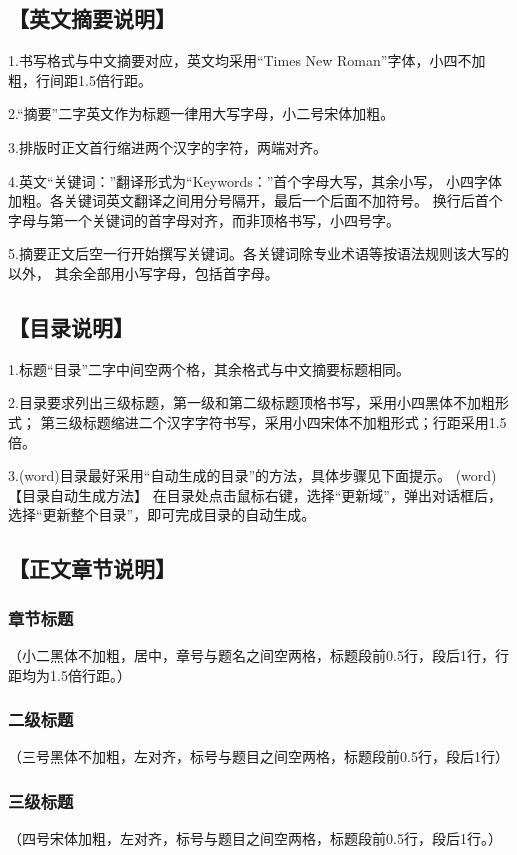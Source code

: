 \begin{appendices}
    \subsection*{【英文摘要说明】}
    1.书写格式与中文摘要对应，英文均采用“Times New Roman”字体，小四不加粗，行间距1.5倍行距。

    2.“摘要”二字英文作为标题一律用大写字母，小二号宋体加粗。

    3.排版时正文首行缩进两个汉字的字符，两端对齐。

    4.英文“关键词：”翻译形式为“Keywords：”首个字母大写，其余小写，
    小四字体加粗。各关键词英文翻译之间用分号隔开，最后一个后面不加符号。
    换行后首个字母与第一个关键词的首字母对齐，而非顶格书写，小四号字。

    5.摘要正文后空一行开始撰写关键词。各关键词除专业术语等按语法规则该大写的以外，
    其余全部用小写字母，包括首字母。

    \subsection*{【目录说明】}
    1.标题“目录”二字中间空两个格，其余格式与中文摘要标题相同。

    2.目录要求列出三级标题，第一级和第二级标题顶格书写，采用小四黑体不加粗形式；
    第三级标题缩进二个汉字字符书写，采用小四宋体不加粗形式；行距采用1.5倍。

    3.(word)目录最好采用“自动生成的目录”的方法，具体步骤见下面提示。
    (word)【目录自动生成方法】
    在目录处点击鼠标右键，选择“更新域”，弹出对话框后，选择“更新整个目录”，即可完成目录的自动生成。

    \subsection*{【正文章节说明】}

    \subsubsection*{章节标题}
    （小二黑体不加粗，居中，章号与题名之间空两格，标题段前0.5行，段后1行，行距均为1.5倍行距。）

    \subsubsection*{二级标题}
    （三号黑体不加粗，左对齐，标号与题目之间空两格，标题段前0.5行，段后1行）

    \subsubsection*{三级标题}
    （四号宋体加粗，左对齐，标号与题目之间空两格，标题段前0.5行，段后1行。）


\end{appendices}
